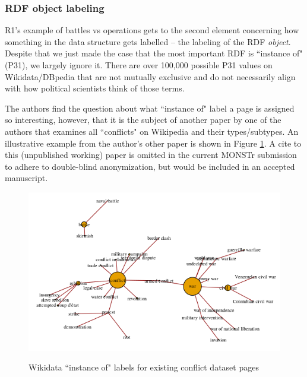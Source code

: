 \documentclass[fleqn,12pt]{article}
\begin{document}
\subsubsection*{RDF object labeling}
R1's example of battles vs operations gets to the second element concerning how something in the data structure gets labelled -- the labeling of the RDF \textit{object}. Despite that we just made the case that the most important RDF is ``instance of" (P31), we largely ignore it. There are over 100,000 possible P31 values on Wikidata/DBpedia that are not mutually exclusive and do not necessarily align with how political scientists think of those terms.

The authors find the question about what ``instance of" label a page is assigned so interesting, however, that it is the subject of another paper by one of the authors that examines all ``conflicts" on Wikipedia and their types/subtypes. An illustrative example from the author's other paper is shown in Figure \ref{fig:p13}. A cite to this (unpublished working) paper is omitted in the current MONSTr submission to adhere to double-blind anonymization, but would be included in an accepted manuscript.

\begin{figure}[h]
    \begin{center}
	\caption{Wikidata ``instance of" labels for existing conflict dataset pages}
	\label{fig:p13}
	{\includegraphics[width = \textwidth]{conflict_branch_existingdata.png}}
    \end{center}
\end{figure}
\end{document}

